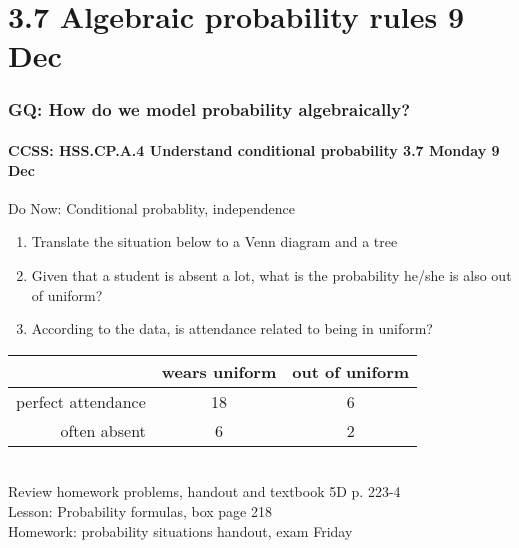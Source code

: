 \documentclass{beamer}
\begin{document}
\section{3.7 Algebraic probability rules 9 Dec}
\frame
{
  \frametitle{GQ: How do we model probability algebraically?}
  \framesubtitle{CCSS: HSS.CP.A.4 Understand conditional probability \hfill \alert{3.7 Monday 9 Dec}}

  \begin{block}{Do Now: Conditional probablity, independence}
  \begin{enumerate}
    \item Translate the situation below to a Venn diagram and a tree
    \item Given that a student is absent a lot, what is the probability he/she is also out of uniform?
    \item According to the data, is attendance related to being in uniform?
  \end{enumerate}
  \end{block}
  \begin{tabular}{r|c|c|}
    & wears uniform & out of uniform\\
    \hline
    perfect attendance & 18 & 6\\
    \hline
    often absent & 6 & 2\\
    \hline
  \end{tabular}\\[0.5cm]
  Review homework problems, handout and textbook 5D p. 223-4 \\
  Lesson: Probability formulas, box page 218 \\ \smallskip
  Homework: probability situations handout, \alert{exam Friday}
}
\end{document}
